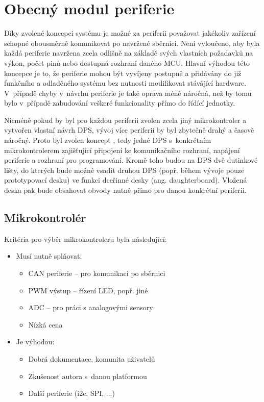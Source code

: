 \chapter{Obecný modul periferie}
    Díky zvolené koncepci systému je možné za periferii považovat jakékoliv zařízení schopné obousměrně komunikovat po navržené sběrnici. Není vyloučeno, aby byla každá periferie navržena zcela odlišně na základě svých vlastních požadavků na výkon, počet pinů nebo dostupná rozhraní daného MCU. Hlavní výhodou této koncepce je to, že periferie mohou být vyvíjeny postupně a přidávány do již funkčního a odladěného systému bez nutnosti modifikovat stávájící hardware. V~případě chyby v~návrhu periferie je také oprava méně náročná, než by tomu bylo v~případě zabudování veškeré funkcionality přímo do řídící jednotky. 

    Nicméně pokud by byl pro každou periferii zvolen zcela jiný mikrokontroler a vytvořen vlastní návrh DPS, vývoj více periferií by byl zbytečně drahý a časově náročný. Proto byl zvolen koncept , tedy jedné DPS s~konkrétním mikrokontrolerem zajišťující připojení ke komunikačního rozhraní, napájení periferie a rozhraní pro programování. Kromě toho budou na DPS dvě dutinkové lišty, do kterých bude možné vsadit druhou DPS (popř. během vývoje pouze prototypovací desku) ve funkci dceřinné desky (ang. daughterboard). Vložená deska pak bude obsahovat obvody nutné přímo pro danou konkrétní periferii.
    
    \section{Mikrokontrolér}

        Kritéria pro výběr mikrokontroleru byla následující:
        \begin{itemize}
            \item Musí nutně splňovat:
            \begin{itemize}
                \item CAN periferie -- pro komunikaci po sběrnici 
                \item PWM výstup -- řízení LED, popř. jiné
                \item ADC -- pro práci s analogovými sensory
                \item Nízká cena 
            \end{itemize}
            \item Je výhodou:
            \begin{itemize}
                \item Dobrá dokumentace, komunita uživatelů
                \item Zkušenost autora s~danou platformou
                \item Další periferie (\acs{i2c}, SPI, ...)
            \end{itemize}
        \end{itemize}

